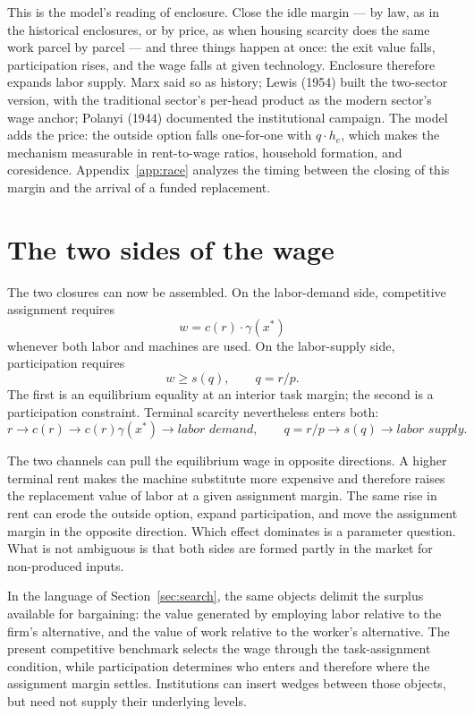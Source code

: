 \documentclass[12pt]{article}
\theoremstyle{plain}
\begin{document}
This is the model's reading of enclosure. Close the idle margin --- by law, as in the historical enclosures, or by price, as when housing scarcity does the same work parcel by parcel --- and three things happen at once: the exit value falls, participation rises, and the wage falls at given technology. Enclosure therefore expands labor supply. Marx said so as history; Lewis (1954) built the two-sector version, with the traditional sector's per-head product as the modern sector's wage anchor; Polanyi (1944) documented the institutional campaign. The model adds the price: the outside option falls one-for-one with $q\cdot h_e$, which makes the mechanism measurable in rent-to-wage ratios, household formation, and coresidence. Appendix~\ref{app:race} analyzes the timing between the closing of this margin and the arrival of a funded replacement.

\section{The two sides of the wage}\label{sec:interval}

The two closures can now be assembled. On the labor-demand side, competitive
assignment requires
\[
w = c(r)\cdot\gamma(x^*)
\]
whenever both labor and machines are used. On the labor-supply side,
participation requires
\[
w \ge s(q), \qquad q=r/p.
\]
The first is an equilibrium equality at
an interior task margin; the second is a participation constraint. Terminal
scarcity nevertheless enters both:
\[
r
\to c(r)
\to c(r)\gamma(x^*)
\to \textit{labor demand},
\qquad
q=r/p
\to s(q)
\to \textit{labor supply}.
\]

The two channels can pull the equilibrium wage in opposite directions. A higher
terminal rent makes the machine substitute more expensive and therefore raises
the replacement value of labor at a given assignment margin. The same rise in
rent can erode the outside option, expand participation, and move the assignment
margin in the opposite direction. Which effect dominates is a parameter
question. What is not ambiguous is that both sides are formed partly in the
market for non-produced inputs.

In the language of Section~\ref{sec:search}, the same objects delimit the surplus
available for bargaining: the value generated by employing labor relative to
the firm's alternative, and the value of work relative to the worker's
alternative. The present competitive benchmark selects the wage through the
task-assignment condition, while participation determines who enters and
therefore where the assignment margin settles. Institutions can insert wedges
between those objects, but need not supply their underlying levels.
\end{document}
